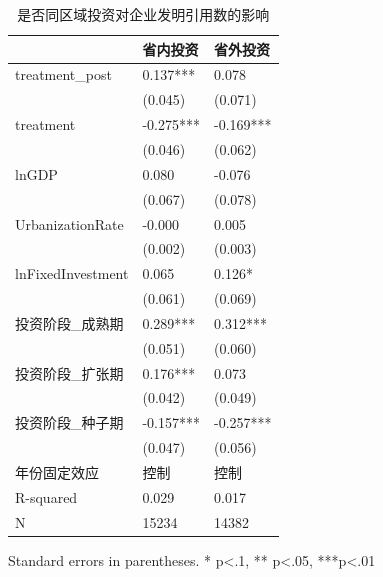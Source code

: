 \begin{table}
\caption{是否同区域投资对企业发明引用数的影响}
\label{}
\begin{center}
\begin{tabular}{lll}
\hline
                  & 省内投资      & 省外投资       \\
\hline
treatment\_post   & 0.137***  & 0.078      \\
                  & (0.045)   & (0.071)    \\
treatment         & -0.275*** & -0.169***  \\
                  & (0.046)   & (0.062)    \\
lnGDP             & 0.080     & -0.076     \\
                  & (0.067)   & (0.078)    \\
UrbanizationRate              & -0.000    & 0.005      \\
                  & (0.002)   & (0.003)    \\
lnFixedInvestment & 0.065     & 0.126*     \\
                  & (0.061)   & (0.069)    \\
投资阶段\_成熟期         & 0.289***  & 0.312***   \\
                  & (0.051)   & (0.060)    \\
投资阶段\_扩张期         & 0.176***  & 0.073      \\
                  & (0.042)   & (0.049)    \\
投资阶段\_种子期         & -0.157*** & -0.257***  \\
                  & (0.047)   & (0.056)    \\
年份固定效应  & 控制 & 控制\\ 
\hline

R-squared         & 0.029     & 0.017      \\
N                 & 15234     & 14382      \\
\hline
\end{tabular}
\end{center}
\end{table}
\bigskip
Standard errors in parentheses. \newline 
* p<.1, ** p<.05, ***p<.01


